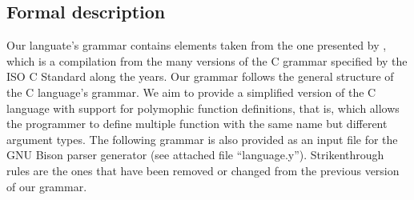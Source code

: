 \documentclass[12pt]{article}
\begin{document}
\subsection{Formal description}

Our languate's grammar contains elements taken from the one presented by \textcite{Harbison2002},
which is a compilation from the many versions of the C grammar specified by the ISO C Standard
along the years. Our grammar follows the general structure of the C language's grammar.
We aim to provide a simplified version of the C language with support for polymophic function
definitions, that is, which allows the programmer to define multiple function with the same name
but different argument types. The following grammar is also provided as an input file for the
GNU Bison \cite{BISON} parser generator (see attached file ``language.y''). Strikenthrough
rules are the ones that have been removed or changed from the previous version of our grammar.
\end{document}
